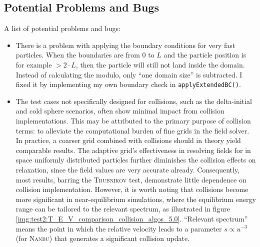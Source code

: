 \subsection{Potential Problems and Bugs}


A list of potential problems and bugs:
\begin{itemize}
    \item There is a problem with applying the boundary conditions for very fast particles. When the boundaries are from $0$ to $L$ and the particle position is for example $>2\cdot L$, then the particle will still not land inside the domain. Instead of calculating the modulo, only ``one domain size'' is subtracted. I fixed it by implementing my own boundary check in \texttt{applyExtendedBC()}.
    \item The test cases not specifically designed for collisions, such as the delta-initial and cold sphere scenarios, often show minimal impact from collision implementations. This may be attributed to the primary purpose of collision terms: to alleviate the computational burden of fine grids in the field solver. In practice, a coarser grid combined with collisions should in theory yield comparable results. The adaptive grid's effectiveness in resolving fields for in space uniformly distributed particles further diminishes the collision effects on relaxation, since the field values are very accurate already. Consequently, most results, barring the \textsc{Trubnikov} test, demonstrate little dependence on collision implementation. However, it is worth noting that collisions become more significant in near-equilibrium simulations, where the equilibrium energy range can be tailored to the relevant spectrum, as illustrated in figure \ref{img:test2:T_E_V_comparison_collision_algos_5.0}. ``Relevant spectrum'' means the point in which the relative velocity leads to a parameter $s \propto u^{-3}$ (for \textsc{Nanbu}) that generates a significant collision update.
\end{itemize}


